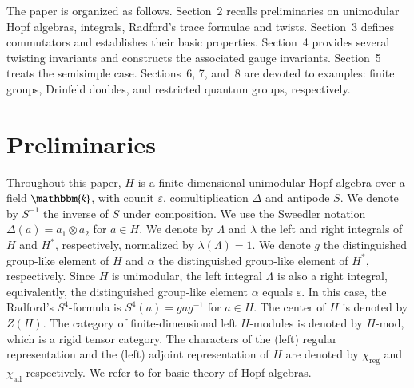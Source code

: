 \documentclass[11pt]{amsart}
\numberwithin{equation}{section}
\begin{document}
The paper is organized as follows. Section~2 recalls preliminaries on unimodular Hopf algebras, integrals, Radford's trace formulae and twists. Section~3 defines commutators and establishes their basic properties. Section~4 provides several twisting invariants and constructs the associated gauge invariants. Section~5 treats the semisimple case. Sections~6, 7, and~8 are devoted to examples: finite groups, Drinfeld doubles, and restricted quantum groups, respectively.


\section{\bf Preliminaries}
Throughout this paper, $H$ is a finite-dimensional unimodular Hopf algebra over a field $\mathbbm{k}$, with counit $\varepsilon$, comultiplication $\Delta$ and antipode $S$. We denote by $S^{-1}$ the inverse of $S$ under composition. We use the Sweedler notation $\Delta(a)=a_{1}\otimes a_{2}$ for $a\in H$. We denote by $\Lambda$ and $\lambda$ the left and right integrals of $H$ and $H^*$, respectively, normalized by $\lambda(\Lambda)=1$. We denote $g$ the distinguished group-like element of $H$ and $\alpha$ the distinguished group-like element of $H^*$, respectively. 
Since $H$ is unimodular, the left integral $\Lambda$ is also a right integral, equivalently, the distinguished group-like element $\alpha$ equals $\varepsilon$. In this case, the Radford's $S^4$-formula is $S^4(a)=gag^{-1}$ for $a\in H$. The center of $H$ is denoted by $Z(H)$. The category of finite-dimensional left $H$-modules is denoted by $H$-mod, which is a rigid tensor category. The characters of the (left) regular representation and the (left) adjoint representation of $H$ are denoted by $\chi_{\operatorname{reg}}$ and $\chi_{\operatorname{ad}}$ respectively.
We refer to \cite{Mon} for basic theory of Hopf algebras.
\end{document}
